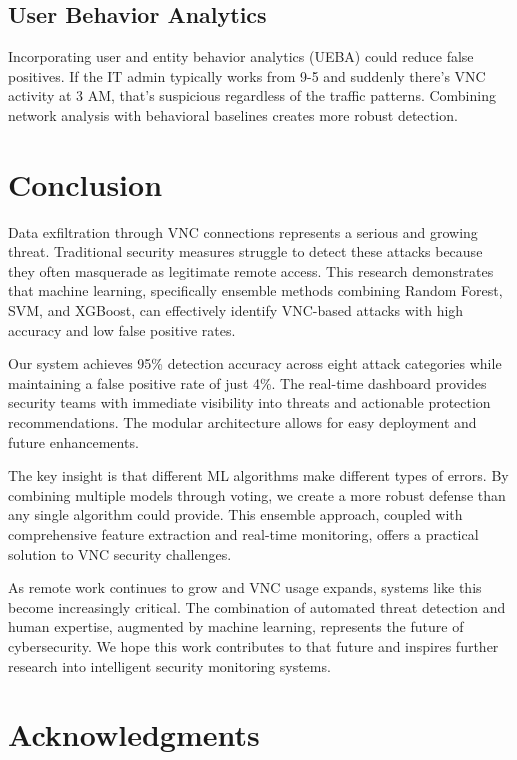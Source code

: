 \documentclass[conference]{IEEEtran}
\begin{document}
\subsection{User Behavior Analytics}

Incorporating user and entity behavior analytics (UEBA) could reduce false positives. If the IT admin typically works from 9-5 and suddenly there's VNC activity at 3 AM, that's suspicious regardless of the traffic patterns. Combining network analysis with behavioral baselines creates more robust detection.

\section{Conclusion}

Data exfiltration through VNC connections represents a serious and growing threat. Traditional security measures struggle to detect these attacks because they often masquerade as legitimate remote access. This research demonstrates that machine learning, specifically ensemble methods combining Random Forest, SVM, and XGBoost, can effectively identify VNC-based attacks with high accuracy and low false positive rates.

Our system achieves 95\% detection accuracy across eight attack categories while maintaining a false positive rate of just 4\%. The real-time dashboard provides security teams with immediate visibility into threats and actionable protection recommendations. The modular architecture allows for easy deployment and future enhancements.

The key insight is that different ML algorithms make different types of errors. By combining multiple models through voting, we create a more robust defense than any single algorithm could provide. This ensemble approach, coupled with comprehensive feature extraction and real-time monitoring, offers a practical solution to VNC security challenges.

As remote work continues to grow and VNC usage expands, systems like this become increasingly critical. The combination of automated threat detection and human expertise, augmented by machine learning, represents the future of cybersecurity. We hope this work contributes to that future and inspires further research into intelligent security monitoring systems.

\section*{Acknowledgments}
\end{document}
